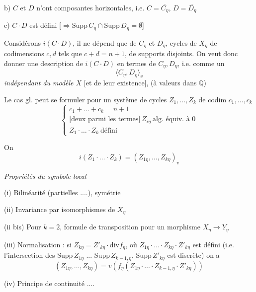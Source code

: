 \documentclass[11pt,a4paper]{article}
\begin{document}
b) $C$ et $D$ n'ont  composantes horizontales, i.e.
$C = \overline{C_\eta}$, $D = \overline{D_\eta}$

c) $C \cdot D$ est défini
[$\Longrightarrow \mathrm{Supp}\, C_\eta \cap \mathrm{Supp}\, D_\eta = \emptyset$]

Considérons $i(C \cdot D)$, il ne dépend que de \struck{\ill{}} $C_\eta$ et
$D_\eta$, cycles de $X_\eta$ de codimensions $c, d$ tels que
$c + d = n + 1$, de supports \struck{\ill{}} disjoints. On veut donc
donner une description de $i(C \cdot D)$ en termes de $C_\eta, D_\eta$,
i.e. comme un
\[
  \langle C_\eta, D_\eta \rangle_v
\]
\emph{indépendant du modèle $X$} [et de leur existence], (à valeurs dans
$\mathbb{Q}$) 

Le cas gl. peut se formuler pour un système de cycles
$Z_1, \dots, Z_k$ de codim $c_1, \dots, c_k$
\[
  \left\{
  \begin{array}{l}
    c_1 + \dots + c_k = n + 1 \\
    \text{[deux parmi les termes]}\ Z_{i\eta}\ \text{alg. équiv. à } 0 \\
    Z_1 \cdot \ldots \cdot Z_k \ \text{défini}
  \end{array}
  \right.
\]

On 
\[
  i(Z_1 \cdot \ldots \cdot Z_k) = (Z_{1\eta}, \dots, Z_{k\eta})_v
\]

\emph{Propriétés du symbole local}

(i) Bilinéarité (partielles ....), symétrie

(ii) Invariance par isomorphismes de $X_\eta$

(ii bis) Pour $k = 2$, formule de transposition pour un morphisme
$X_\eta \to Y_\eta$

(iii)  Normalisation : si
$Z_{k\eta} = Z'_{k\eta} \cdot \mathrm{div} f_\eta$,  où
$Z_{1\eta} \cdot \ldots \cdot Z_{k\eta} \cdot Z'_{k\eta}$ est défini (i.e.
l'intersection des $\mathrm{Supp}\, Z_{1\eta}$ ... $\mathrm{Supp}\, Z_{k-1,\eta}$,
$\mathrm{Supp}\, Z'_{k\eta}$ est discrète) on a
\struck{\ill{}} \ill{}
\[
  (Z_{1\eta}, \dots, Z_{k\eta}) = v(f_\eta(Z_{1\eta} \cdot \ldots \cdot Z_{k-1,\eta} \cdot Z'_{k\eta}))
\]

(iv) Principe de continuité ....

\end{document}

